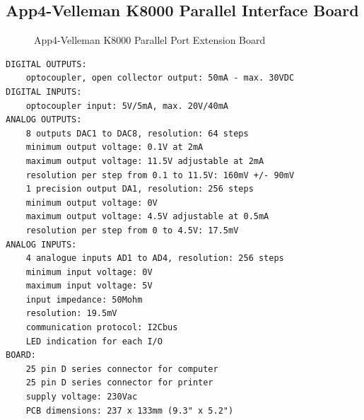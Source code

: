 		
\clearpage
\pagebreak
		
\subsection{App4-Velleman K8000 Parallel Interface Board}

	\begin{figure}[htbp]
		\begin{center}
			\caption{App4-Velleman K8000 Parallel Port Extension Board}
			\label{fig:App4-Captured-Velleman-K8000 Parallel-Port-Extension-Board.jpg}
		\end{center}
	\end{figure}
	
\lstset{basicstyle=\ttfamily\small}
\begin{lstlisting}[breaklines, frame=single, caption={App4-Specifications of Velleman K8000 Parallel Interface Board}, label=App4-Specifications-Velleman-K8000-Interface-Board]
DIGITAL OUTPUTS:
    optocoupler, open collector output: 50mA - max. 30VDC
DIGITAL INPUTS:
    optocoupler input: 5V/5mA, max. 20V/40mA
ANALOG OUTPUTS:
    8 outputs DAC1 to DAC8, resolution: 64 steps
    minimum output voltage: 0.1V at 2mA
    maximum output voltage: 11.5V adjustable at 2mA
    resolution per step from 0.1 to 11.5V: 160mV +/- 90mV
    1 precision output DA1, resolution: 256 steps
    minimum output voltage: 0V
    maximum output voltage: 4.5V adjustable at 0.5mA
    resolution per step from 0 to 4.5V: 17.5mV
ANALOG INPUTS:
    4 analogue inputs AD1 to AD4, resolution: 256 steps
    minimum input voltage: 0V
    maximum input voltage: 5V
    input impedance: 50Mohm
    resolution: 19.5mV
    communication protocol: I2Cbus
    LED indication for each I/O
BOARD:
    25 pin D series connector for computer
    25 pin D series connector for printer
    supply voltage: 230Vac
    PCB dimensions: 237 x 133mm (9.3" x 5.2")
\end{lstlisting}			
			
